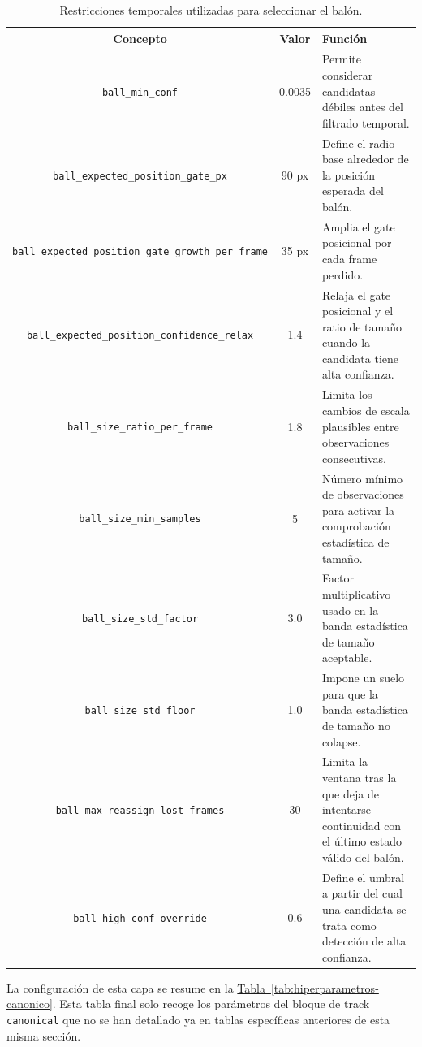 \begin{table}[htbp]
    \centering
    \scriptsize
    \begin{tabular}{c|c|p{7.5cm}}
        \textbf{Concepto} & \textbf{Valor} & \textbf{Función} \\
        \hline\hline
        \texttt{ball\_min\_conf} & 0.0035 & Permite considerar candidatas débiles antes del filtrado temporal. \\
        \texttt{ball\_expected\_position\_gate\_px} & 90 px & Define el radio base alrededor de la posición esperada del balón. \\
        \texttt{ball\_expected\_position\_gate\_growth\_per\_frame} & 35 px & Amplia el gate posicional por cada frame perdido. \\
        \texttt{ball\_expected\_position\_confidence\_relax} & 1.4 & Relaja el gate posicional y el ratio de tamaño cuando la candidata tiene alta confianza. \\
        \texttt{ball\_size\_ratio\_per\_frame} & 1.8 & Limita los cambios de escala plausibles entre observaciones consecutivas. \\
        \texttt{ball\_size\_min\_samples} & 5 & Número mínimo de observaciones para activar la comprobación estadística de tamaño. \\
        \texttt{ball\_size\_std\_factor} & 3.0 & Factor multiplicativo usado en la banda estadística de tamaño aceptable. \\
        \texttt{ball\_size\_std\_floor} & 1.0 & Impone un suelo para que la banda estadística de tamaño no colapse. \\
        \texttt{ball\_max\_reassign\_lost\_frames} & 30 & Limita la ventana tras la que deja de intentarse continuidad con el último estado válido del balón. \\
        \texttt{ball\_high\_conf\_override} & 0.6 & Define el umbral a partir del cual una candidata se trata como detección de alta confianza. \\
        \hline
    \end{tabular}
    \caption{Restricciones temporales utilizadas para seleccionar el balón.}
    \label{tab:balon-tracking}
\end{table}

La configuración de esta capa se resume en la \hyperref[tab:hiperparametros-canonico]{Tabla~\ref*{tab:hiperparametros-canonico}}. Esta tabla final solo recoge los parámetros del bloque de track \texttt{canonical} que no se han detallado ya en tablas específicas anteriores de esta misma sección.

